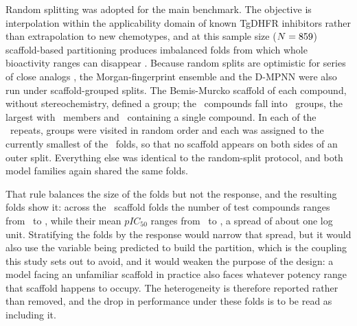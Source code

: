 Random splitting was adopted for the main benchmark. The objective is interpolation within the applicability domain of
known TgDHFR inhibitors rather than extrapolation to new chemotypes, and at this sample size ($N = 859$)
scaffold-based partitioning produces imbalanced folds from which whole bioactivity ranges can disappear
\citep{kyrali2022}. Because random splits are optimistic for series of close analogs \citep{yang2019, aga2025}, the
Morgan-fingerprint ensemble and the D-MPNN were also run under scaffold-grouped splits. The Bemis-Murcko scaffold of
each compound, without stereochemistry, defined a group; the \NCompounds\ compounds fall into \ScaffoldNGroups\ groups,
the largest with \ScaffoldLargestGroup\ members and \ScaffoldSingletonGroups\ containing a single compound. In each of
the \OuterRepeats\ repeats, groups were visited in random order and each was assigned to the currently smallest of the
\OuterKFolds\ folds, so that no scaffold appears on both sides of an outer split. Everything else was identical to the
random-split protocol, and both model families again shared the same folds.

That rule balances the size of the folds but not the response, and the resulting folds show it: across the
\TotalOuterFolds\ scaffold folds the number of test compounds ranges from \ScaffoldFoldSizeMin\ to
\ScaffoldFoldSizeMax, while their mean $pIC_{50}$ ranges from \ScaffoldFoldPICMeanMin\ to \ScaffoldFoldPICMeanMax, a
spread of about one log unit. Stratifying the folds by the response would narrow that spread, but it would also use the
variable being predicted to build the partition, which is the coupling this study sets out to avoid, and it would
weaken the purpose of the design: a model facing an unfamiliar scaffold in practice also faces whatever potency range
that scaffold happens to occupy. The heterogeneity is therefore reported rather than removed, and the drop in
performance under these folds is to be read as including it.

